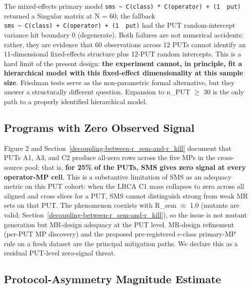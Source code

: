 \documentclass[manuscript,screen,review]{acmart}
\begin{document}
The mixed-effects primary model
\texttt{sms\ \textasciitilde{}\ C(class)\ *\ C(operator)\ +\ (1\ \textbar{}\ put)}
returned a Singular matrix at N = 60; the fallback
\texttt{sms\ \textasciitilde{}\ C(class)\ +\ C(operator)\ +\ (1\ \textbar{}\ put)}
had the PUT random-intercept variance hit boundary 0 (degenerate). Both
failures are not numerical accidents; rather, they are evidence that 60
observations across 12 PUTs cannot identify an 11-dimensional
fixed-effects structure plus 12-PUT random intercepts. This is a hard
limit of the present design: \textbf{the experiment cannot, in
principle, fit a hierarchical model with this fixed-effect
dimensionality at this sample size}. Friedman tests serve as the
non-parametric formal alternative, but they answer a structurally
different question. Expansion to n\_PUT $\geq$ 30 is the only path to a
properly identified hierarchical model.

\subsection{Programs with Zero Observed Signal}\label{put-level-zero-mass-cohort}

Figure 2 and Section~\ref{decoupling-between-r_sem-and-r_kill} document that PUTs A1, A3, and C2 produce all-zero
rows across the five MPs in the cross-source pool; that is,
\textbf{for 25\% of the PUTs, SMS gives zero signal at every operator-MP
cell}. This is a substantive limitation of SMS as an adequacy metric on
this PUT cohort: when the LRCA C1 mass collapses to zero across all
aligned and cross slices for a PUT, SMS cannot distinguish strong from
weak MR sets on that PUT. The phenomenon coexists with R\_sem $\approx$ 1.0
(mutants are valid; Section~\ref{decoupling-between-r_sem-and-r_kill}), so the issue is not mutant generation but
MR-design adequacy at the PUT level. MR-design refinement (per-PUT
MP discovery) and the proposed pre-registered c-class primary-MP rule
on a fresh dataset are the principal mitigation paths. We declare this
as a residual PUT-level zero-signal threat.

\subsection{Protocol-Asymmetry Magnitude Estimate}\label{r13-protocol-asymmetry-magnitude-estimate}
\end{document}
